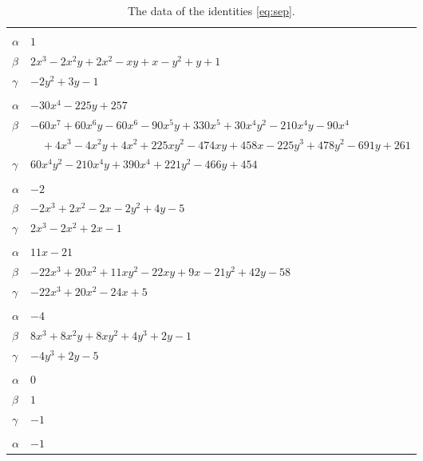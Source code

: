 \documentclass[11pt]{article}
\begin{document}
\begingroup\footnotesize
\setlength{\LTcapwidth}{\textwidth}
\begin{longtable}{@{}ll@{}}
\caption{The data of the identities \eqref{eq:sep}.}\label{tab:sep}\\
\hline\endfirsthead\hline\endhead\hline\endfoot
\multicolumn{2}{@{}l}{$\{i,j\}=\{0,9\}$, $k_{ij}=2$}\\
$\alpha$ & $1$\\
$\beta$ & $2x^{3}-2x^{2}y+2x^{2}-xy+x-y^{2}+y+1$\\
$\gamma$ & $-2y^{2}+3y-1$\\
\addlinespace[3pt]
\multicolumn{2}{@{}l}{$\{i,j\}=\{0,11\}$, $k_{ij}=2^{6}$}\\
$\alpha$ & $-30x^{4}-225y+257$\\
$\beta$ & $-60x^{7}+60x^{6}y-60x^{6}-90x^{5}y+330x^{5}+30x^{4}y^{2}-210x^{4}y-90x^{4}$\\
 & $\quad +4x^{3}-4x^{2}y+4x^{2}+225xy^{2}-474xy+458x-225y^{3}+478y^{2}-691y+261$\\
$\gamma$ & $60x^{4}y^{2}-210x^{4}y+390x^{4}+221y^{2}-466y+454$\\
\addlinespace[3pt]
\multicolumn{2}{@{}l}{$\{i,j\}=\{1,7\}$, $k_{ij}=2$}\\
$\alpha$ & $-2$\\
$\beta$ & $-2x^{3}+2x^{2}-2x-2y^{2}+4y-5$\\
$\gamma$ & $2x^{3}-2x^{2}+2x-1$\\
\addlinespace[3pt]
\multicolumn{2}{@{}l}{$\{i,j\}=\{1,11\}$, $k_{ij}=2^{5}$}\\
$\alpha$ & $11x-21$\\
$\beta$ & $-22x^{3}+20x^{2}+11xy^{2}-22xy+9x-21y^{2}+42y-58$\\
$\gamma$ & $-22x^{3}+20x^{2}-24x+5$\\
\addlinespace[3pt]
\multicolumn{2}{@{}l}{$\{i,j\}=\{2,3\}$, $k_{ij}=1$}\\
$\alpha$ & $-4$\\
$\beta$ & $8x^{3}+8x^{2}y+8xy^{2}+4y^{3}+2y-1$\\
$\gamma$ & $-4y^{3}+2y-5$\\
\addlinespace[3pt]
\multicolumn{2}{@{}l}{$\{i,j\}=\{2,4\}$, $k_{ij}=1$}\\
$\alpha$ & $0$\\
$\beta$ & $1$\\
$\gamma$ & $-1$\\
\addlinespace[3pt]
\multicolumn{2}{@{}l}{$\{i,j\}=\{2,7\}$, $k_{ij}=1$}\\
$\alpha$ & $-1$\\

\end{longtable}
\end{document}
